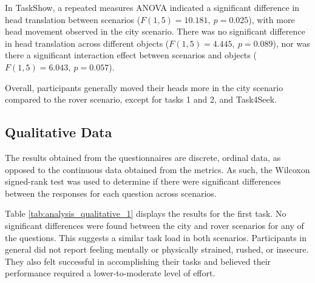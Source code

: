             In TaskShow, a repeated measures ANOVA indicated a significant difference in head translation between scenarios ($F(1, 5) = 10.181,\ p = 0.025$), with more head movement observed in the city scenario. There was no significant difference in head translation across different objects ($F(1, 5) = 4.445,\ p = 0.089$), nor was there a significant interaction effect between scenarios and objects ($F(1, 5) = 6.043,\ p = 0.057$).

            Overall, participants generally moved their heads more in the city scenario compared to the rover scenario, except for tasks 1 and 2, and Task4Seek.

    \subsection{Qualitative Data}

        The results obtained from the questionnaires are discrete, ordinal data, as opposed to the continuous data obtained from the metrics. As such, the Wilcoxon signed-rank test was used to determine if there were significant differences between the responses for each question across scenarios.

        Table \ref{tab:analysis_qualitative_1} displays the results for the first task. No significant differences were found between the city and rover scenarios for any of the questions. This suggests a similar task load in both scenarios. Participants in general did not report feeling mentally or physically strained, rushed, or insecure. They also felt successful in accomplishing their tasks and believed their performance required a lower-to-moderate level of effort.
       
